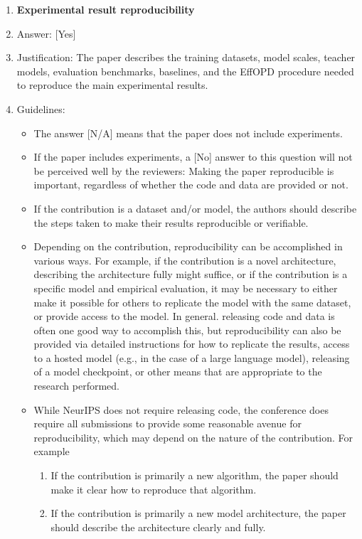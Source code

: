\documentclass{llmxive}
\providecommand{\answerYes}[1][]{[Yes]#1}
\providecommand{\answerNo}[1][]{[No]#1}
\providecommand{\answerNA}[1][]{[N/A]#1}
\begin{document}
\begin{enumerate}
\item {\bf Experimental result reproducibility}
    \item[] Answer: \answerYes{}
    \item[] Justification: The paper describes the training datasets, model scales, teacher models, evaluation benchmarks, baselines, and the EffOPD procedure needed to reproduce the main experimental results.
    \item[] Guidelines:
    \begin{itemize}
        \item The answer \answerNA{} means that the paper does not include experiments.
        \item If the paper includes experiments, a \answerNo{} answer to this question will not be perceived well by the reviewers: Making the paper reproducible is important, regardless of whether the code and data are provided or not.
        \item If the contribution is a dataset and\slash or model, the authors should describe the steps taken to make their results reproducible or verifiable. 
        \item Depending on the contribution, reproducibility can be accomplished in various ways. For example, if the contribution is a novel architecture, describing the architecture fully might suffice, or if the contribution is a specific model and empirical evaluation, it may be necessary to either make it possible for others to replicate the model with the same dataset, or provide access to the model. In general. releasing code and data is often one good way to accomplish this, but reproducibility can also be provided via detailed instructions for how to replicate the results, access to a hosted model (e.g., in the case of a large language model), releasing of a model checkpoint, or other means that are appropriate to the research performed.
        \item While NeurIPS does not require releasing code, the conference does require all submissions to provide some reasonable avenue for reproducibility, which may depend on the nature of the contribution. For example
        \begin{enumerate}
            \item If the contribution is primarily a new algorithm, the paper should make it clear how to reproduce that algorithm.
            \item If the contribution is primarily a new model architecture, the paper should describe the architecture clearly and fully.

\end{enumerate}
\end{itemize}
\end{enumerate}
\end{document}
